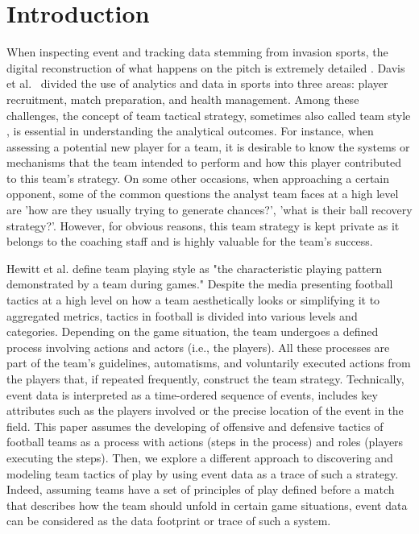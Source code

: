 \documentclass[runningheads]{llncs}
\begin{document}
\section{Introduction}\label{sec:introduction}
When inspecting event and tracking data stemming from invasion sports, the digital reconstruction of what happens on the pitch is extremely detailed \cite{Gudmundsson2017,Lepschy2020}. Davis et al.~\cite{Davis202207} divided the use of analytics and data in sports into three areas: player recruitment, match preparation, and health management. Among these challenges, the concept of team tactical strategy, sometimes also called team style \cite{Hewitt2016}, is essential in understanding the analytical outcomes. For instance, when assessing a potential new player for a team, it is desirable to know the systems or mechanisms that the team intended to perform and how this player contributed to this team's strategy. On some other occasions, when approaching a certain opponent, some of the common questions the analyst team faces at a high level are 'how are they usually trying to generate chances?', 'what is their ball recovery strategy?'. However, for obvious reasons, this team strategy is kept private as it belongs to the coaching staff and is highly valuable for the team's success.

Hewitt et al. \cite{Hewitt2016} define team playing style as "the characteristic playing pattern demonstrated by a team during games." Despite the media presenting football tactics at a high level on how a team aesthetically looks or simplifying it to aggregated metrics, tactics in football is divided into various levels and categories. Depending on the game situation, the team undergoes a defined process involving actions and actors (i.e., the players). All these processes are part of the team's guidelines, automatisms, and voluntarily executed actions from the players that, if repeated frequently, construct the team strategy. Technically, event data is interpreted as a time-ordered sequence of events, includes key attributes such as the players involved or the precise location of the event in the field. This paper assumes the developing of offensive and defensive tactics of football teams as a process with actions (steps in the process) and roles (players executing the steps). Then, we explore a different approach to discovering and modeling team tactics of play by using event data as a trace of such a strategy. Indeed, assuming teams have a set of principles of play defined before a match that describes how the team should unfold in certain game situations, event data can be considered as the data footprint or trace of such a system.
\end{document}
